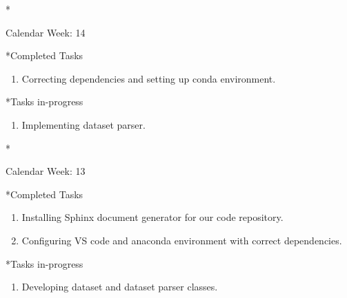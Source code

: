 \documentclass[11pt,a4paper]{article}
\begin{document}
\newpage
\begin{section}*{Calendar Week: 14  \hfill \date{09 April, 2021}}
 \begin{refsection}
     \begin{subsection}*{Completed Tasks}
         \begin{enumerate}
             \item Correcting dependencies and setting up conda environment.
         \end{enumerate}
     \end{subsection}
     \begin{subsection}*{Tasks in-progress}
         \begin{enumerate}
             \item Implementing dataset parser.
         \end{enumerate}
     \end{subsection}
 \end{refsection}
\end{section}

\newpage
\begin{section}*{Calendar Week: 13  \hfill \date{02 April, 2021}}
 \begin{refsection}
     \begin{subsection}*{Completed Tasks}
         \begin{enumerate}
             \item Installing Sphinx document generator for our code repository.
             \item Configuring VS code and anaconda environment with correct dependencies.
         \end{enumerate}
     \end{subsection}
     \begin{subsection}*{Tasks in-progress}
         \begin{enumerate}
             \item Developing dataset and dataset parser classes.
         \end{enumerate}
     \end{subsection}
 \end{refsection}
\end{section}
\end{document}

